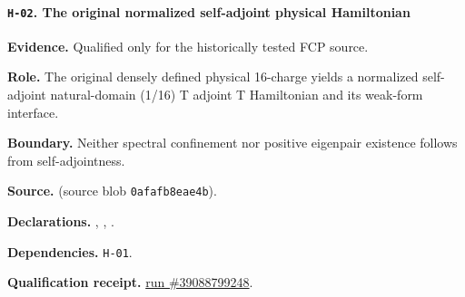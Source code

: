 \paragraph{\texttt{H-02}. The original normalized self-adjoint physical Hamiltonian}
\noindent\textbf{Evidence.} Qualified only for the historically tested FCP source.
\par\noindent\textbf{Role.} The original densely defined physical 16-charge yields a normalized self-adjoint natural-domain (1/16) T adjoint T Hamiltonian and its weak-form interface.
\par\noindent\textbf{Boundary.} Neither spectral confinement nor positive eigenpair existence follows from self-adjointness.
\par\noindent\textbf{Source.}  (source blob \texttt{0afafb8eae4b}).
\par\noindent\textbf{Declarations.} , , .
\par\noindent\textbf{Dependencies.} \texttt{H-01}.
\par\noindent\textbf{Qualification receipt.} \href{https://github.com/etblink/Foundational-Convergence-Program/actions/runs/39088799248}{run \#39088799248}.
\medskip

